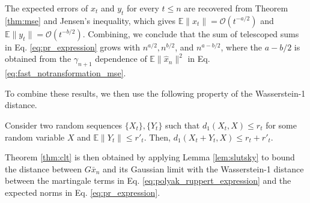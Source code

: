 The expected errors of $x_t$ and $y_t$ for every $t \leq n$ are recovered from Theorem \ref{thm:mse} and Jensen's inequality, which gives $\mathbb{E}\lVert x_t \rVert = \mathcal{O}(t^{-a/2})$ and $\mathbb{E}\lVert y_t \rVert = \mathcal{O}(t^{-b/2})$.
Combining, we conclude that the sum of telescoped sums in Eq. \eqref{eq:pr_expression} grows with $n^{a/2}, n^{b/2}$, and $n^{a-b/2}$, where the $a-b/2$ is obtained from the $\gamma_{n+1}$ dependence of $\mathbb{E}\lVert \hat{x}_n \rVert^2$ in Eq. \eqref{eq:fast_notransformation_mse}.



To combine these results, we then use the following property of the Wasserstein-1 distance.
\begin{lemma}\label{lem:slutsky}
    Consider two random sequences $\{X_t\}, \{Y_t\}$ such that $d_1 (X_t, X) \leq r_t$ for some random variable $X$ and $\mathbb{E}\lVert Y_t \rVert \leq r'_t$.
    Then, $d_1 (X_t + Y_t, X) \leq r_t + r'_t$.
\end{lemma}
Theorem \ref{thm:clt} is then obtained by applying Lemma \ref{lem:slutsky} to bound the distance between $G \bar{x}_n$ and its Gaussian limit with the Wasserstein-1 distance between the martingale terms in Eq. \eqref{eq:polyak_ruppert_expression} and the expected norms in Eq. \eqref{eq:pr_expression}. 



